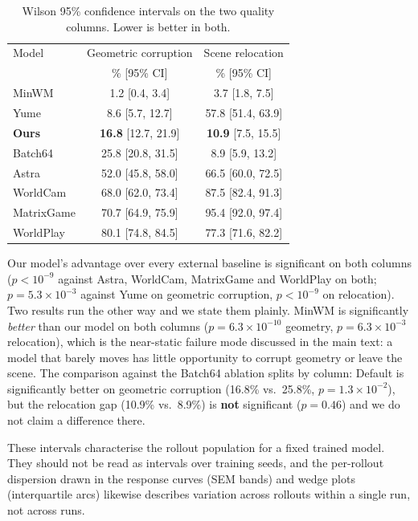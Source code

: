 \begin{table}[t]
\centering
\small
\begin{tabular}{lcc}
\toprule
Model & Geometric corruption & Scene relocation \\
      & \% [95\% CI]         & \% [95\% CI] \\
\midrule
MinWM      & \phantom{0}1.2 [0.4, 3.4]    & \phantom{0}3.7 [1.8, 7.5] \\
Yume       & \phantom{0}8.6 [5.7, 12.7]   & 57.8 [51.4, 63.9] \\
\textbf{Ours} & \textbf{16.8} [12.7, 21.9] & \textbf{10.9} [7.5, 15.5] \\
Batch64    & 25.8 [20.8, 31.5]            & \phantom{0}8.9 [5.9, 13.2] \\
Astra      & 52.0 [45.8, 58.0]            & 66.5 [60.0, 72.5] \\
WorldCam   & 68.0 [62.0, 73.4]            & 87.5 [82.4, 91.3] \\
MatrixGame & 70.7 [64.9, 75.9]            & 95.4 [92.0, 97.4] \\
WorldPlay  & 80.1 [74.8, 84.5]            & 77.3 [71.6, 82.2] \\
\bottomrule
\end{tabular}
\caption{Wilson 95\% confidence intervals on the two quality columns. Lower is
better in both.}
\label{tab:signif}
\end{table}

Our model's advantage over every external baseline is significant on both
columns ($p < 10^{-9}$ against Astra, WorldCam, MatrixGame and WorldPlay on
both; $p = 5.3\times10^{-3}$ against Yume on geometric corruption, $p < 10^{-9}$
on relocation). Two results run the other way and we state them plainly. MinWM
is significantly \emph{better} than our model on both columns
($p = 6.3\times10^{-10}$ geometry, $p = 6.3\times10^{-3}$ relocation), which is
the near-static failure mode discussed in the main text: a model that barely
moves has little opportunity to corrupt geometry or leave the scene. The
comparison against the Batch64 ablation splits by column: Default is
significantly better on geometric corruption (16.8\% vs.\ 25.8\%,
$p = 1.3\times10^{-2}$), but the relocation gap (10.9\% vs.\ 8.9\%) is
\textbf{not} significant ($p = 0.46$) and we do not claim a difference there.

These intervals characterise the rollout population for a fixed trained model.
They should not be read as intervals over training seeds, and the per-rollout
dispersion drawn in the response curves (SEM bands) and wedge plots
(interquartile arcs) likewise describes variation across rollouts within a
single run, not across runs.

